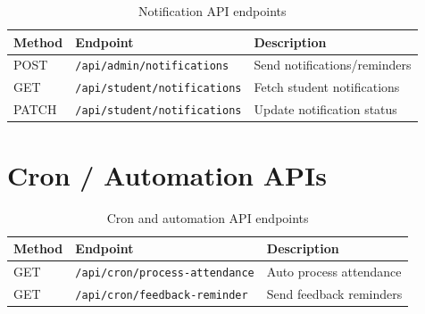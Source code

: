 \begin{table}[!ht]
    \centering
    \begin{tabular}{|l|l|p{6.5cm}|}
    \hline
    \textbf{Method} & \textbf{Endpoint} & \textbf{Description} \\ \hline
    POST  & \texttt{/api/admin/notifications}   & Send notifications/reminders \\
    GET   & \texttt{/api/student/notifications} & Fetch student notifications \\
    PATCH & \texttt{/api/student/notifications} & Update notification status \\ \hline
    \end{tabular}
    \caption{Notification API endpoints}
    \label{tab:api_notif}
\end{table}

\section{Cron / Automation APIs}

\begin{table}[!ht]
    \centering
    \begin{tabular}{|l|l|p{6.5cm}|}
    \hline
    \textbf{Method} & \textbf{Endpoint} & \textbf{Description} \\ \hline
    GET & \texttt{/api/cron/process-attendance} & Auto process attendance \\
    GET & \texttt{/api/cron/feedback-reminder}  & Send feedback reminders \\ \hline
    \end{tabular}
    \caption{Cron and automation API endpoints}
    \label{tab:api_cron}
\end{table}
